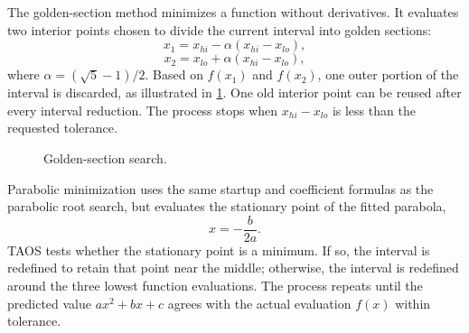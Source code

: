 
The golden-section method minimizes a function without derivatives. It evaluates
two interior points chosen to divide the current interval into golden sections:
\begin{equation}
  x_1=x_{hi}-\alpha(x_{hi}-x_{lo}),
  \label{eq:golden-section-x1}
\end{equation}
\begin{equation}
  x_2=x_{lo}+\alpha(x_{hi}-x_{lo}),
  \label{eq:golden-section-x2}
\end{equation}
where
$\alpha=(\sqrt{5}-1)/2$. Based on $f(x_1)$ and $f(x_2)$, one outer portion of the
interval is discarded, as illustrated in \cref{fig:golden-section-search}. One old
interior point can be reused after every interval reduction. The process stops when
$x_{hi}-x_{lo}$ is less than the requested tolerance.

\begin{figure}[htbp]
  \centering
  
  \caption{Golden-section search.}
  \label{fig:golden-section-search}
\end{figure}


Parabolic minimization uses the same startup and coefficient formulas as the
parabolic root search, but evaluates the stationary point of the fitted parabola,
\begin{equation}
  x=-\frac{b}{2a}.
  \label{eq:parabolic-minimum}
\end{equation}
TAOS tests whether the stationary point is a minimum. If so, the interval is redefined
to retain that point near the middle; otherwise, the interval is redefined around the
three lowest function evaluations. The process repeats until the predicted value
$a x^2+b x+c$ agrees with the actual evaluation $f(x)$ within tolerance.
